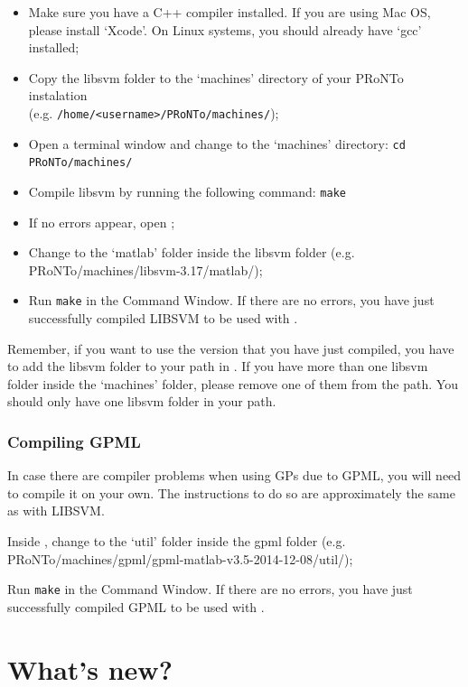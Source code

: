 \begin{itemize}
    \item Make sure you have a C++ compiler installed. If you are using Mac OS, please install `Xcode'. On Linux systems, you should already have `gcc' installed;
    \item Copy the libsvm folder to the `machines' directory of your PRoNTo instalation\\(e.g. {\tt /home/<username>/PRoNTo/machines/});
    \item Open a terminal window and change to the `machines' directory: {\tt cd PRoNTo/machines/}
    \item Compile libsvm by running the following command: {\tt make}
    \item If no errors appear, open \matlab;
    \item Change to the `matlab' folder inside the libsvm folder (e.g. PRoNTo/machines/libsvm-3.17/matlab/);
    \item Run {\tt make} in the \matlab{} Command Window. If there are no errors, you have just successfully compiled LIBSVM to be used with \matlab.
\end{itemize}

Remember, if you want to use the version that you have just compiled, you have to add the libsvm folder to your path in \matlab. If you have more than one libsvm folder inside the `machines' folder, please remove one of them from the \matlab{} path. You should only have one libsvm folder in your path.

\subsubsection{Compiling GPML}
In case there are compiler problems when using GPs due to GPML, you will need to compile it on your own. The instructions to do so are approximately the same as with LIBSVM.

\bi
\item Inside \matlab, change to the `util' folder inside the gpml folder (e.g. PRoNTo/machines/gpml/gpml-matlab-v3.5-2014-12-08/util/);

\item Run {\tt make} in the \matlab{} Command Window. If there are no errors, you have just successfully compiled GPML to be used with \matlab.
\ei


\section{What's new?}

